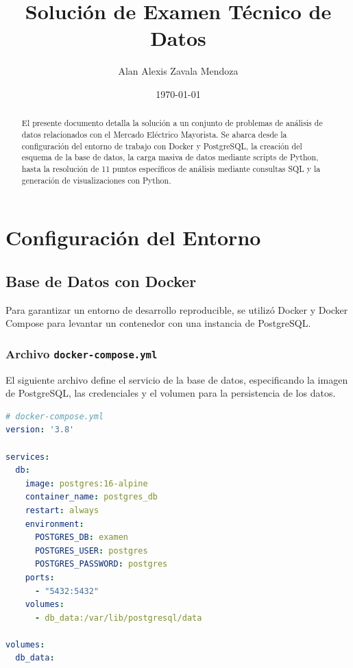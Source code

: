 \documentclass[11pt, a4paper]{article}
\title{Solución de Examen Técnico de Datos}
\author{Alan Alexis Zavala Mendoza}
\date{\today}
\begin{document}
\maketitle

\begin{abstract}
El presente documento detalla la solución a un conjunto de problemas de análisis de datos relacionados con el Mercado Eléctrico Mayorista. Se abarca desde la configuración del entorno de trabajo con Docker y PostgreSQL, la creación del esquema de la base de datos, la carga masiva de datos mediante scripts de Python, hasta la resolución de 11 puntos específicos de análisis mediante consultas SQL y la generación de visualizaciones con Python.
\end{abstract}

\tableofcontents

\newpage

\section{Configuración del Entorno}

\subsection{Base de Datos con Docker}
Para garantizar un entorno de desarrollo reproducible, se utilizó Docker y Docker Compose para levantar un contenedor con una instancia de PostgreSQL.

\subsubsection{Archivo \texttt{docker-compose.yml}}
El siguiente archivo define el servicio de la base de datos, especificando la imagen de PostgreSQL, las credenciales y el volumen para la persistencia de los datos.

\begin{lstlisting}[language=YAML]
# docker-compose.yml
version: '3.8'

services:
  db:
    image: postgres:16-alpine
    container_name: postgres_db
    restart: always
    environment:
      POSTGRES_DB: examen
      POSTGRES_USER: postgres
      POSTGRES_PASSWORD: postgres
    ports:
      - "5432:5432"
    volumes:
      - db_data:/var/lib/postgresql/data

volumes:
  db_data: 
\end{lstlisting}
\end{document}
